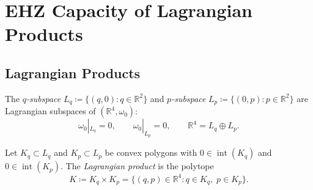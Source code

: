 %

\section{EHZ Capacity of Lagrangian Products}\label{sec:billiard}


\subsection{Lagrangian Products}\label{subsec:lagrangian-products}

\begin{definition}\label{def:lagrangian-subspaces}
The \emph{$q$-subspace} $L_q \coloneqq \{(q, 0) : q \in \mathbb{R}^2\}$
and \emph{$p$-subspace} $L_p \coloneqq \{(0, p) : p \in \mathbb{R}^2\}$
are Lagrangian subspaces of $(\mathbb{R}^4, \omega_0)$:
\[
  \omega_0|_{L_q} = 0, \qquad
  \omega_0|_{L_p} = 0, \qquad
  \mathbb{R}^4 = L_q \oplus L_p.
\]
\end{definition}

\begin{definition}\label{def:lagrangian-product}
Let $K_q \subset L_q$ and $K_p \subset L_p$ be convex polygons
with $0 \in \operatorname{int}(K_q)$ and $0 \in \operatorname{int}(K_p)$.
The \emph{Lagrangian product} is the polytope
\[
  K \coloneqq K_q \times K_p
  = \{ (q, p) \in \mathbb{R}^4 : q \in K_q,\; p \in K_p \}.
\]
\end{definition}

